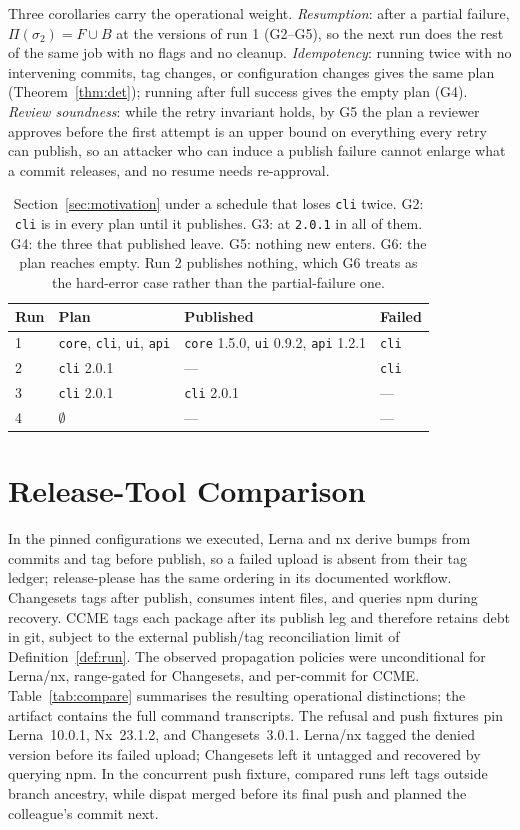\documentclass[10pt,conference]{IEEEtran}
\theoremstyle{definition}
\newcommand{\code}[1]{\texttt{#1}}
\newcommand{\G}[1]{G#1}
\begin{document}
Three corollaries carry the operational weight. \emph{Resumption}: after
a partial failure, $\Pi(\sigma_2) = F \cup B$ at the versions of run 1
(\G{2}--\G{5}), so the next run does the rest of the same job with no
flags and no cleanup. \emph{Idempotency}: running twice with no intervening
commits, tag changes, or configuration changes gives the same plan
(Theorem~\ref{thm:det});
running after full success gives the empty plan (\G{4}).
\emph{Review soundness}: while the retry invariant holds, by \G{5} the plan a reviewer approves before
the first attempt is an upper bound on everything every retry can
publish, so an attacker who can induce a publish failure cannot enlarge
what a commit releases, and no resume needs re-approval.

\begin{table}[t]
\caption{Section~\ref{sec:motivation} under a schedule that loses
\code{cli} twice. \G{2}: \code{cli} is in every plan until it
publishes. \G{3}: at \code{2.0.1} in all of them. \G{4}: the three that
published leave. \G{5}: nothing new enters. \G{6}: the plan reaches
empty. Run 2 publishes nothing, which \G{6} treats as the hard-error
case rather than the partial-failure one.}
\label{tab:runs}
\small
\begin{tabular}{@{}llll@{}}
\toprule
Run & Plan & Published & Failed \\
\midrule
1 & \code{core}, \code{cli}, \code{ui}, \code{api}
  & \code{core} 1.5.0, \code{ui} 0.9.2, \code{api} 1.2.1 & \code{cli} \\
2 & \code{cli} 2.0.1 & --- & \code{cli} \\
3 & \code{cli} 2.0.1 & \code{cli} 2.0.1 & --- \\
4 & $\emptyset$ & --- & --- \\
\bottomrule
\end{tabular}
\end{table}

\section{Release-Tool Comparison}
\label{sec:compare}

In the pinned configurations we executed, Lerna and nx derive bumps from
commits and tag before publish, so a failed upload is absent from their tag
ledger; release-please has the same ordering in its documented workflow.
Changesets tags after publish, consumes intent files, and queries npm during
recovery.
CCME tags each package after its publish leg and therefore retains debt in git,
subject to the external publish/tag reconciliation limit of
Definition~\ref{def:run}. The observed propagation policies were unconditional
for Lerna/nx, range-gated for Changesets, and per-commit for CCME.
Table~\ref{tab:compare}
summarises the resulting operational distinctions; the artifact contains the
full command transcripts.
The refusal and push fixtures pin Lerna~10.0.1, Nx~23.1.2, and
Changesets~3.0.1. Lerna/nx tagged the denied version before its failed upload;
Changesets left it untagged and recovered by querying npm. In the concurrent
push fixture, compared runs left tags outside branch ancestry, while dispat
merged before its final push and planned the colleague's commit next.
\end{document}
